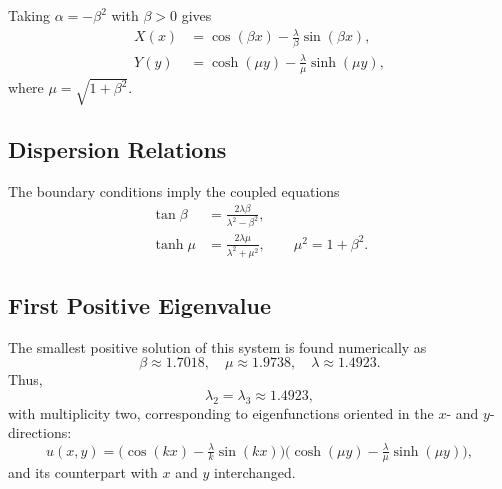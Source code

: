 \documentclass[a4,11pt]{article}
\numberwithin{equation}{section}
\begin{document}
Taking $\alpha = -\beta^2$ with $\beta>0$ gives
\begin{align*}
X(x) &= \cos(\beta x) - \frac{\lambda}{\beta}\sin(\beta x), \\
Y(y) &= \cosh(\mu y) - \frac{\lambda}{\mu}\sinh(\mu y),
\end{align*}
where $\mu=\sqrt{1+\beta^2}$.

\subsection*{Dispersion Relations}
The boundary conditions imply the coupled equations
\begin{align*}
\tan \beta &= \frac{2\lambda \beta}{\lambda^2 - \beta^2}, \\
\tanh \mu &= \frac{2\lambda \mu}{\lambda^2 + \mu^2}, 
\qquad \mu^2 = 1+\beta^2.
\end{align*}

\subsection*{First Positive Eigenvalue}
The smallest positive solution of this system is found numerically as
\begin{equation*}
\beta \approx 1.7018, \quad \mu \approx 1.9738, 
\quad \lambda \approx 1.4923.
\end{equation*}
Thus,
\begin{equation*}
\lambda_2 = \lambda_3 \approx 1.4923,
\end{equation*}
with multiplicity two, corresponding to eigenfunctions oriented in the $x$- and $y$-directions:
\begin{equation*}
u(x,y)=\Big(\cos(kx)-\tfrac{\lambda}{k}\sin(kx)\Big)\Big(\cosh(\mu y)-\tfrac{\lambda}{\mu}\sinh(\mu y)\Big),
\end{equation*}
and its counterpart with $x$ and $y$ interchanged.

\fi


\end{document}
